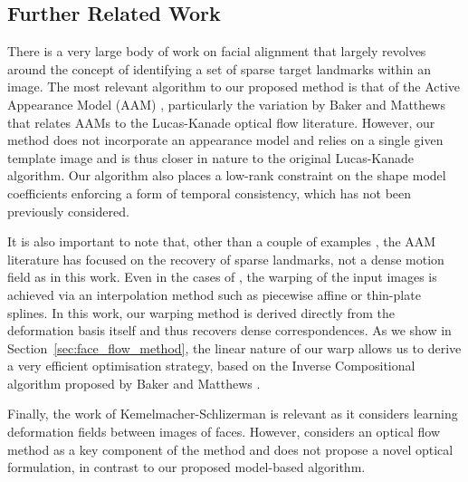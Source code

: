 \subsection{Further Related Work}\label{subsec:face_flow_further_related_work}
There is a very large body of work on facial alignment that largely revolves
around the concept of identifying a set of sparse target landmarks within an
image. The most relevant algorithm to our proposed method is that of the
Active Appearance Model (AAM) \cite{cootes2001active}, particularly the variation by
Baker and Matthews \cite{matthews2004active} that relates AAMs to the Lucas-Kanade
\cite{lucas1981iterative,baker2004lucas} optical flow literature. However, our method
does not incorporate an appearance model and relies on a single given template
image and is thus closer in nature to the original Lucas-Kanade algorithm. 
Our algorithm also places a low-rank constraint on the shape model coefficients
enforcing a form of temporal consistency, which has not been previously 
considered.

It is also important to note that, other than a couple of examples
\cite{ramnath2008increasing,anderson2014using}, the AAM literature has focused on the
recovery of sparse landmarks, not a dense motion field as in this work.
Even in the cases of \cite{ramnath2008increasing,anderson2014using}, the warping of the
input images is achieved via an interpolation method such as
piecewise affine or thin-plate splines. In this work, our warping
method is derived directly from the deformation basis itself and thus recovers
dense correspondences.
As we show in Section~\ref{sec:face_flow_method}, the linear nature of our warp allows
us to derive a very efficient optimisation strategy,
based on the Inverse Compositional algorithm proposed by Baker and Matthews
\cite{baker2004lucas}. 

Finally, the work of Kemelmacher-Schlizerman \mbox{\etal} \cite{kemelmacher2012collection}
is relevant as it considers learning deformation fields between images of faces.
However, \cite{kemelmacher2012collection} considers an optical flow method
as a key component of the method and does not propose a novel optical formulation,
in contrast to our proposed model-based algorithm.
